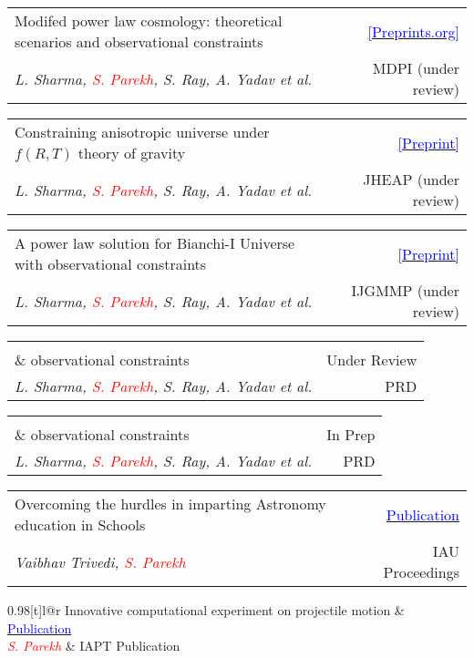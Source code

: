 \documentclass[a4paper,11pt]{article}
\makeatletter
\newcommand{\resumePublication}[4]{
\vspace{0.5mm}\item
    \begin{tabular*}{0.98\textwidth}[t]{l@{\extracolsep{\fill}}r}
        {#1} & {\footnotesize{#3}} \\
        \footnotesize{\textit{#2}} & \footnotesize{#4}
    \end{tabular*}
    \vspace{0.5mm}
}
\makeatother
\begin{document}
    \resumePublication
      {Modifed power law cosmology: theoretical scenarios and observational constraints} %
      {L. Sharma, \textcolor{red}{S. Parekh}, S. Ray, A. Yadav et al.} %
      {\href{https://doi.org/10.20944/preprints202402.0564.v1}{\textcolor{blue}{[Preprints.org]}}} %
      {MDPI (under review)} %

    \resumePublication
      {Constraining anisotropic universe under $f(R,T)$ theory of gravity} %
      {L. Sharma, \textcolor{red}{S. Parekh}, S. Ray, A. Yadav et al.} %
      {\href{https://sureshparekh.github.io/Preprint/Bianchi_5.pdf}{\textcolor{blue}{[Preprint]}}} %
      {JHEAP (under review)} %

    \resumePublication
      {A power law solution for Bianchi-I Universe with observational constraints} %
      {L. Sharma, \textcolor{red}{S. Parekh}, S. Ray, A. Yadav et al.} %
      {\href{https://sureshparekh.github.io/Preprint/Bianchi1.pdf}{\textcolor{blue}{[Preprint]}}} %
      {IJGMMP (under review)} %

    \resumePublication
      {Generation of Bulk Viscous Cosmological Model in $f(R,T)$ Gravity\\ \& observational constraints} %
      {L. Sharma, \textcolor{red}{S. Parekh}, S. Ray, A. Yadav et al.} %
      {Under Review} %
      {PRD} %

    \resumePublication
      {Cosmological aspects of a hyperbolic solution in  $f(R,T)$ theory of gravity\\ \& observational constraints} %
      {L. Sharma, \textcolor{red}{S. Parekh}, S. Ray, A. Yadav et al.} %
      {In Prep} %
      {PRD} %

    \resumePublication
      {Overcoming the hurdles in imparting Astronomy education in Schools} %
      {Vaibhav Trivedi, \textcolor{red}{S. Parekh}} %
      {\href{https://owncloud.gwdg.de/index.php/s/RQjMBL5XIonrxSl#page=90}{\textcolor{blue}{Publication}}} %
      {IAU Proceedings} %

    \resumePublication
      {Innovative computational experiment on projectile motion} %
      {\textcolor{red}{S. Parekh}} %
      {\href{https://books.google.co.in/books?id=zqE5EAAAQBAJ&pg=PA110&lpg=PA110&dq=projectile+motion+suresh+parekh&source=bl&ots=FfF1i9kOuD&sig=ACfU3U3I2vNn_bxFekrH82mw3_tiOPgdhA&hl=en&sa=X&ved=2ahUKEwjvsvq3mISBAxWEZ2wGHbTLDcwQ6AF6BAgMEAM#v=onepage&q&f=false}{\textcolor{blue}{Publication}}} %
      {IAPT Publication} %
\end{document}
